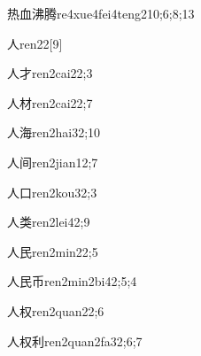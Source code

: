 \begin{verbete}{热血沸腾}{re4xue4fei4teng2}{10;6;8;13}
\end{verbete}

\begin{verbete}{人}{ren2}{2}[9]
\end{verbete}

\begin{verbete}{人才}{ren2cai2}{2;3}
\end{verbete}

\begin{verbete}{人材}{ren2cai2}{2;7}
\end{verbete}

\begin{verbete}{人海}{ren2hai3}{2;10}
\end{verbete}

\begin{verbete}{人间}{ren2jian1}{2;7}
\end{verbete}

\begin{verbete}{人口}{ren2kou3}{2;3}
\end{verbete}

\begin{verbete}{人类}{ren2lei4}{2;9}
\end{verbete}

\begin{verbete}{人民}{ren2min2}{2;5}
\end{verbete}

\begin{verbete}{人民币}{ren2min2bi4}{2;5;4}
\end{verbete}

\begin{verbete}{人权}{ren2quan2}{2;6}
\end{verbete}

\begin{verbete}{人权利}{ren2quan2fa3}{2;6;7}
\end{verbete}

